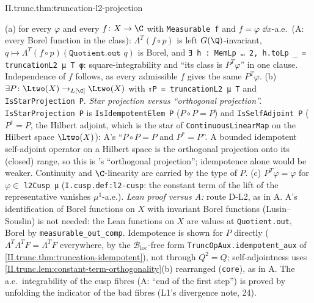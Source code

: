 \begin{tfformal}{II.trunc.thm:truncation-l2-projection}
\begin{tffidelity}
(a) for every $\varphi$ and every $f\colon X\to\C$ with \texttt{Measurable f} and $f=\varphi$ $\dd\dot x$-a.e.\ (A: every Borel function in the class): $\Lambda^T(f\circ p)$ is left $G(\Q)$-invariant, $q\mapsto\Lambda^T(f\circ p)(\texttt{Quotient.out }q)$ is Borel, and \texttt{∃ h : MemLp … 2, h.toLp \_ = truncationL2 μ T φ}: square-integrability and ``its class is $P^T\varphi$'' in one clause. Independence of $f$ follows, as every admissible $f$ gives the same $P^T\varphi$. (b) $\exists P\colon\Ltwo(X)\to_{L[\C]}\Ltwo(X)$ with \texttt{⇑P = truncationL2 μ T} and \texttt{IsStarProjection P}. \emph{Star projection versus ``orthogonal projection''.} \texttt{IsStarProjection P} is \texttt{IsIdempotentElem P} ($P\circ P=P$) and \texttt{IsSelfAdjoint P} ($P^\dagger=P$, the Hilbert adjoint, which is the star of \texttt{ContinuousLinearMap} on the Hilbert space $\Ltwo(X)$): A's ``$P\circ P=P$ and $P^*=P$''. A bounded idempotent self-adjoint operator on a Hilbert space is the orthogonal projection onto its (closed) range, so this is \cite{AIntro}'s ``orthogonal projection''; idempotence alone would be weaker. Continuity and $\C$-linearity are carried by the type of $P$. (c) $P^T\varphi=\varphi$ for $\varphi\in$ \texttt{l2Cusp μ} (\texttt{I.cusp.def:l2-cusp}: the constant term of the lift of the representative vanishes $\mu^1$-a.e.). \emph{Lean proof versus A:} route D-L2, as in A. A's identification of Borel functions on $X$ with invariant Borel functions (Lusin--Souslin) is not needed: the Lean functions on $X$ are values at \texttt{Quotient.out}, Borel by \texttt{measurable\_out\_comp}. Idempotence is shown for $P$ directly ($\Lambda^T\Lambda^TF=\Lambda^TF$ everywhere, by the $\mathcal B_{\mathrm{loc}}$-free form \texttt{TruncOpAux.idempotent\_aux} of \cref{II.trunc.thm:truncation-idempotent}), not through $Q^2=Q$; self-adjointness uses \cref{II.trunc.lem:constant-term-orthogonality}(b) rearranged (\texttt{core}), as in A. The a.e.\ integrability of the cusp fibres (A: ``end of the first step'') is proved by unfolding the indicator of the bad fibres (L1's divergence note, 24).
\end{tffidelity}
\end{tfformal}
